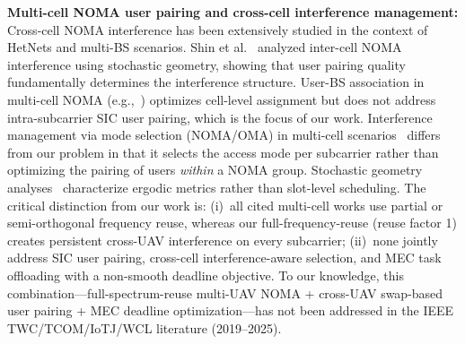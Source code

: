 \documentclass[journal]{IEEEtran}
\begin{document}
\textbf{Multi-cell NOMA user pairing and cross-cell interference management:}
Cross-cell NOMA interference has been extensively studied in the context of HetNets and multi-BS scenarios.
Shin et al.~\cite{shin2017non} analyzed inter-cell NOMA interference using stochastic geometry, showing that user pairing quality fundamentally determines the interference structure.
User-BS association in multi-cell NOMA (e.g.,~\cite{yang2022cost}) optimizes cell-level assignment but does not address intra-subcarrier SIC user pairing, which is the focus of our work.
Interference management via mode selection (NOMA/OMA) in multi-cell scenarios~\cite{liu2023hybrid} differs from our problem in that it selects the access mode per subcarrier rather than optimizing the pairing of users \emph{within} a NOMA group.
Stochastic geometry analyses~\cite{ni2021ris,shin2017non} characterize ergodic metrics rather than slot-level scheduling.
The critical distinction from our work is: (i)~all cited multi-cell works use partial or semi-orthogonal frequency reuse, whereas our full-frequency-reuse (reuse factor 1) creates persistent cross-UAV interference on every subcarrier; (ii)~none jointly address SIC user pairing, cross-cell interference-aware selection, and MEC task offloading with a non-smooth deadline objective.
To our knowledge, this combination---full-spectrum-reuse multi-UAV NOMA + cross-UAV swap-based user pairing + MEC deadline optimization---has not been addressed in the IEEE TWC/TCOM/IoTJ/WCL literature (2019--2025).
\end{document}
